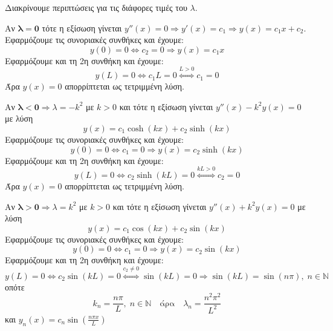 \begin{solution}
  Διακρίνουμε περιπτώσεις για τις διάφορες τιμές του $ \lambda $.
  \begin{myitemize}
    \item Αν $ \bm{\lambda = 0} $ τότε η εξίσωση γίνεται 
      $ y''(x)=0 \Rightarrow y'(x) = c_{1} \Rightarrow y(x) = c_{1}x + c_{2} $. 
      Εφαρμόζουμε τις συνοριακές συνθήκες και έχουμε:
      \[
        y(0)=0 \Leftrightarrow c_{2}=0 \Rightarrow y(x) = c_{1}x 
      \] 
      Εφαρμόζουμε και τη 2η συνθήκη και έχουμε:
      \[
        y(L)=0 \Leftrightarrow c_{1}L=0 \overset{L>0}{\Leftrightarrow} c_{1}=0 
      \]
      Άρα $ y(x)=0 $ απορρίπτεται ως τετριμμένη λύση.
    \item Αν $ \bm{\lambda < 0} \Rightarrow \lambda = -k^{2} $ με $ k>0 $ και τότε η 
      εξίσωση γίνεται $ y''(x) -k^{2}y(x)=0$ με λύση 
      \[ 
        y(x) = c_{1} \cosh{(kx)} + c_{2} \sinh{(kx)} 
      \]
      Εφαρμόζουμε τις συνοριακές συνθήκες και έχουμε:
      \[
        y(0)=0 \Leftrightarrow c_{1}=0 \Rightarrow y(x) = c_{2} \sinh{(kx)}  
      \] 
      Εφαρμόζουμε και τη 2η συνθήκη και έχουμε:
      \[
        y(L)=0 \Leftrightarrow c_{2} \sinh{(kL)} = 0 \overset{kL>0}{\Leftrightarrow} 
        c_{2}=0 
      \]
      Άρα $ y(x)=0 $ απορρίπτεται ως τετριμμένη λύση.
    \item Αν $ \bm{\lambda > 0} \Rightarrow \lambda = k^{2} $ με $ k>0 $ και τότε η 
      εξίσωση γίνεται $ y''(x) +k^{2}y(x)=0$ με λύση 
      \[ 
        y(x) = c_{1} \cos{(kx)} + c_{2} \sin{(kx)} 
      \]
      Εφαρμόζουμε τις συνοριακές συνθήκες και έχουμε:
      \[
        y(0)=0 \Leftrightarrow c_{1}=0 \Rightarrow y(x) = c_{2} \sin{(kx)}  
      \] 
      Εφαρμόζουμε και τη 2η συνθήκη και έχουμε:
      \[
        y(L)=0 \Leftrightarrow c_{2} \sin{(kL)} = 0 \overset{c_{2} 
        \neq 0}{\Leftrightarrow} \sin{(kL)} =0 \Rightarrow \sin{(kL)} = \sin{(n \pi)}, \;
        n \in \mathbb{N} 
      \]
      οπότε 
      \[
        k_{n} = \frac{n \pi}{L} , \; n \in \mathbb{N} \quad \text{άρα} \quad 
        \lambda _{n} = \frac{n^{2} \pi ^{2}}{L^{2}} 
      \] 
      και $ y_{n}(x) = c_{n} \sin{\left(\frac{n \pi x}{L} \right)}  $ 
  \end{myitemize}
\end{solution}

